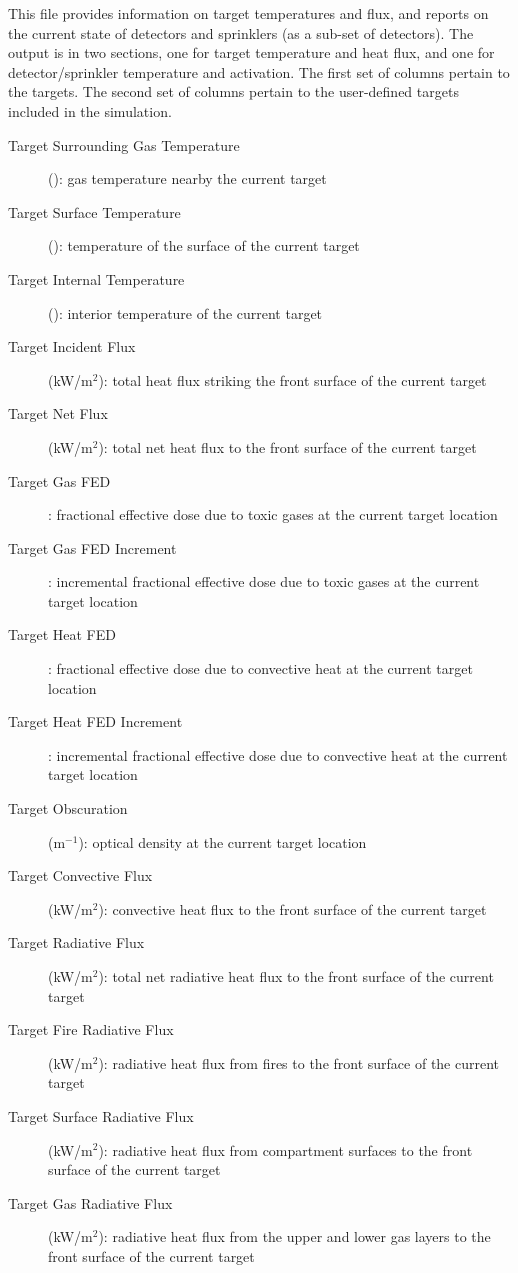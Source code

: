This file provides information on target temperatures and flux, and reports on the current state of detectors and sprinklers (as a sub-set of detectors). The output is in two sections, one for target temperature and heat flux, and one for detector/sprinkler temperature and activation. The first set of columns pertain to the targets.
The second set of columns pertain to the user-defined targets included in the simulation.
\begin{description}
\item[Target Surrounding Gas Temperature] (\degc): gas temperature nearby the current target
\item[Target Surface Temperature] (\degc): temperature of the surface of the current target
\item[Target Internal Temperature] (\degc): interior temperature of the current target
\item[Target Incident Flux] (kW/m$^2$): total heat flux striking the front surface of the current target
\item[Target Net Flux] (kW/m$^2$): total net heat flux to the front surface of the current target
\item[Target Gas FED]: fractional effective dose due to toxic gases at the current target location
\item[Target Gas FED Increment]: incremental fractional effective dose due to toxic gases at the current target location
\item[Target Heat FED]: fractional effective dose due to convective heat at the current target location
\item[Target Heat FED Increment]: incremental fractional effective dose due to convective heat at the current target location
\item[Target Obscuration] (m$^{-1}$):  optical density at the current target location
\item[Target Convective Flux] (kW/m$^2$): convective heat flux to the  front surface of the current target
\item[Target Radiative Flux] (kW/m$^2$): total net radiative heat flux to the front surface of the current target
\item[Target Fire Radiative Flux] (kW/m$^2$): radiative heat flux from fires to the front surface of the current target
\item[Target Surface Radiative Flux] (kW/m$^2$): radiative heat flux from compartment surfaces to the front surface of the current target
\item[Target Gas Radiative Flux] (kW/m$^2$):   radiative heat flux from the upper and lower gas layers to the front surface of the current target

\end{description}
